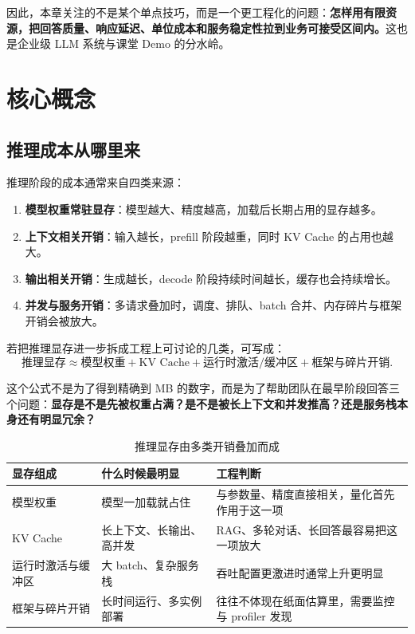 因此，本章关注的不是某个单点技巧，而是一个更工程化的问题：\textbf{怎样用有限资源，把回答质量、响应延迟、单位成本和服务稳定性拉到业务可接受区间内。}这也是企业级 LLM 系统与课堂 Demo 的分水岭。

\section{核心概念}
\subsection{推理成本从哪里来}
推理阶段的成本通常来自四类来源：
\begin{enumerate}
  \item \textbf{模型权重常驻显存}：模型越大、精度越高，加载后长期占用的显存越多。
  \item \textbf{上下文相关开销}：输入越长，prefill 阶段越重，同时 KV Cache 的占用也越大。
  \item \textbf{输出相关开销}：生成越长，decode 阶段持续时间越长，缓存也会持续增长。
  \item \textbf{并发与服务开销}：多请求叠加时，调度、排队、batch 合并、内存碎片与框架开销会被放大。
\end{enumerate}

若把推理显存进一步拆成工程上可讨论的几类，可写成：
\[
\text{推理显存} \approx \text{模型权重} + \text{KV Cache} + \text{运行时激活/缓冲区} + \text{框架与碎片开销}.
\]

这个公式不是为了得到精确到 MB 的数字，而是为了帮助团队在最早阶段回答三个问题：\textbf{显存是不是先被权重占满？是不是被长上下文和并发推高？还是服务栈本身还有明显冗余？}

\begin{table}[H]
\centering
\small
\begin{tabularx}{\textwidth}{>{\raggedright\arraybackslash}p{3.2cm}>{\raggedright\arraybackslash}p{3cm}>{\raggedright\arraybackslash}X}
\toprule
\textbf{显存组成} & \textbf{什么时候最明显} & \textbf{工程判断} \\
\midrule
模型权重 & 模型一加载就占住 & 与参数量、精度直接相关，量化首先作用于这一项 \\
KV Cache & 长上下文、长输出、高并发 & RAG、多轮对话、长回答最容易把这一项放大 \\
运行时激活与缓冲区 & 大 batch、复杂服务栈 & 吞吐配置更激进时通常上升更明显 \\
框架与碎片开销 & 长时间运行、多实例部署 & 往往不体现在纸面估算里，需要监控与 profiler 发现 \\
\bottomrule
\end{tabularx}
\caption{推理显存由多类开销叠加而成}
\label{tab:inference-memory-components}
\end{table}

